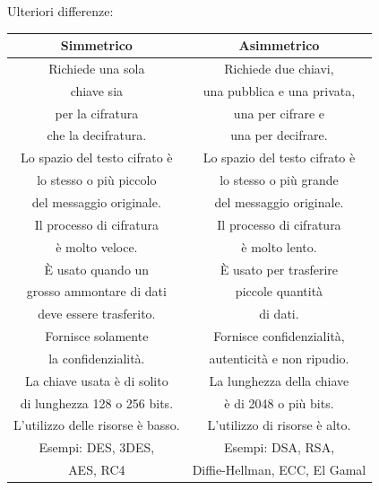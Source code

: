 \textsf{\small Ulteriori differenze: }

\begin{tabular}{|c|c|}
	\hline
	\textbf{Simmetrico} & \textbf{Asimmetrico} \\
	\hline
	\textsf{\small Richiede una sola  } & \textsf{\small Richiede due chiavi, } \\
	\textsf{\small chiave sia} & \textsf{\small  una pubblica e una privata,} \\
	\textsf{\small per la cifratura } & \textsf{\small una per cifrare e } \\
	\textsf{\small che la decifratura.} & \textsf{\small una per decifrare.} \\
	\hline
	\textsf{\small Lo spazio del testo cifrato è  } & \textsf{\small Lo spazio del testo cifrato è  } \\
	\textsf{\small lo stesso o più piccolo } & \textsf{\small lo stesso o più grande } \\
	\textsf{\small del messaggio originale.} & \textsf{\small del messaggio originale.} \\
	\hline
	\textsf{\small Il processo di cifratura } & \textsf{\small Il processo di cifratura } \\
	\textsf{\small è molto veloce.} & \textsf{\small è molto lento.} \\
	\hline
	\textsf{\small È usato quando un  } & \textsf{\small È usato per trasferire } \\
	\textsf{\small grosso ammontare di dati} & \textsf{\small piccole quantità} \\
	\textsf{\small deve essere trasferito.} & \textsf{\small  di dati.} \\
	\hline
	\textsf{\small Fornisce solamente } & \textsf{\small Fornisce confidenzialità, } \\ %
	\textsf{\small la confidenzialità.} & \textsf{\small autenticità e non ripudio.} \\
	\hline
	\textsf{\small La chiave usata è di solito } & \textsf{\small La lunghezza della chiave } \\
	\textsf{\small di lunghezza 128 o 256 bits.} & \textsf{\small è di 2048 o più bits.} \\
	\hline
	\textsf{\small L'utilizzo delle risorse è basso.} & \textsf{\small L'utilizzo di risorse è alto.} \\
	\hline
	\textsf{\small Esempi: DES, 3DES, } & \textsf{\small Esempi: DSA, RSA, } \\
	\textsf{\small AES, RC4} & \textsf{\small Diffie-Hellman, ECC, El Gamal} \\
	\hline
\end{tabular}

